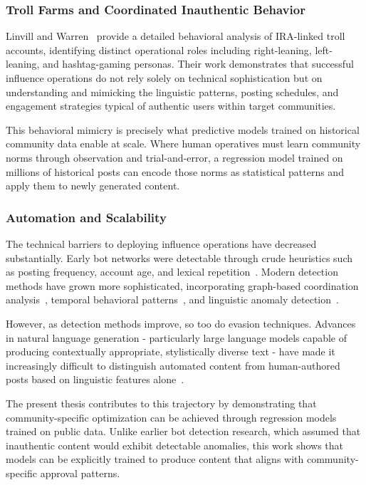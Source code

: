 \subsubsection*{Troll Farms and Coordinated Inauthentic Behavior}

Linvill and Warren~\cite{linvill2020troll} provide a detailed behavioral analysis of IRA-linked troll accounts, identifying distinct operational roles including right-leaning, left-leaning, and hashtag-gaming personas. Their work demonstrates that successful influence operations do not rely solely on technical sophistication but on understanding and mimicking the linguistic patterns, posting schedules, and engagement strategies typical of authentic users within target communities.

This behavioral mimicry is precisely what predictive models trained on historical community data enable at scale. Where human operatives must learn community norms through observation and trial-and-error, a regression model trained on millions of historical posts can encode those norms as statistical patterns and apply them to newly generated content.

\subsubsection*{Automation and Scalability}

The technical barriers to deploying influence operations have decreased substantially. Early bot networks were detectable through crude heuristics such as posting frequency, account age, and lexical repetition~\cite{varol2017online}. Modern detection methods have grown more sophisticated, incorporating graph-based coordination analysis~\cite{cresci2017paradigm}, temporal behavioral patterns~\cite{yang2020scalable}, and linguistic anomaly detection~\cite{hayawi2022anti}.

However, as detection methods improve, so too do evasion techniques. Advances in natural language generation - particularly large language models capable of producing contextually appropriate, stylistically diverse text - have made it increasingly difficult to distinguish automated content from human-authored posts based on linguistic features alone~\cite{zellers2019defending, solaiman2019release}.

The present thesis contributes to this trajectory by demonstrating that community-specific optimization can be achieved through regression models trained on public data. Unlike earlier bot detection research, which assumed that inauthentic content would exhibit detectable anomalies, this work shows that models can be explicitly trained to produce content that aligns with community-specific approval patterns.

